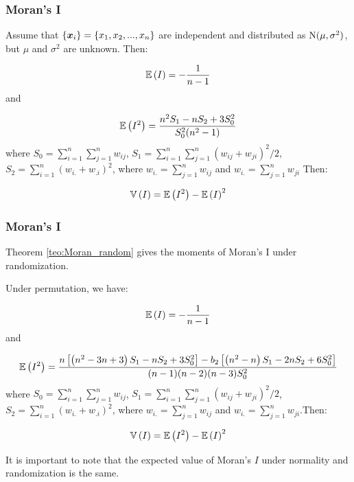 \documentclass[english,10pt]{beamer}\usepackage[]{graphicx}\usepackage[]{xcolor}
\begin{document}
\begin{frame}
  \frametitle{Moran's I}
    \begin{theorem}\label{teo:Moran_normal}
Assume that $\left\lbrace \bm x_i\right\rbrace = \left\lbrace x_1, x_2,..., x_n\right\rbrace$ are independent and distributed as $\mathrm{N}(\mu, \sigma^2)$, but $\mu$ and $\sigma^2$ are unknown. Then:

\begin{equation}
\mathbb{E}\left(I\right) = - \frac{1}{n - 1} 
\end{equation}
%
and

\begin{equation}
\mathbb{E}\left(I^2\right) = \frac{n^2S_1 - nS_2 + 3S_0^2}{S_0^2(n^2 - 1)}
\end{equation}
%
where $S_0=\sum_{i = 1}^n\sum_{j=1}^nw_{ij}$, $S_1= \sum_{i = 1}^n\sum_{j = 1}^n(w_{ij} + w_{ji})^2/2$, $S_2 = \sum_{i = 1}^n(w_{i.} + w_{.i})^2$, where $w_{i.}= \sum_{j = 1}^nw_{ij}$ and $w_{i.}=\sum_{j = 1}^nw_{ji}$
Then:

\begin{equation}
\mathbb{V}\left(I\right)=\mathbb{E}\left(I^2\right) - \mathbb{E}\left(I\right)^2
\end{equation}
\end{theorem}
\end{frame}

\begin{frame}
  \frametitle{Moran's I}
  Theorem \ref{teo:Moran_random} gives the moments of Moran's I under randomization. 


\begin{theorem}\label{teo:Moran_random}
Under permutation, we have:

\begin{equation}
\mathbb{E}\left(I\right) = - \frac{1}{n - 1} 
\end{equation}
%
and

\begin{equation}
\mathbb{E}\left(I^2\right) = \frac{n\left[\left(n^2 - 3n + 3\right)S_1 - nS_2 + 3S_0^2\right]-b_2\left[\left(n^2 - n\right)S_1 - 2nS_2 + 6S_0^2\right]}{(n-1)(n-2)(n-3)S_0^2}
\end{equation}
%
where $S_0=\sum_{i = 1}^n\sum_{j=1}^nw_{ij}$, $S_1= \sum_{i = 1}^n\sum_{j = 1}^n(w_{ij} + w_{ji})^2/2$, $S_2 = \sum_{i = 1}^n(w_{i.} + w_{.i})^2$, where $w_{i.}= \sum_{j = 1}^nw_{ij}$ and $w_{i.}=\sum_{j = 1}^nw_{ji}$.Then:

\begin{equation}
\mathbb{V}\left(I\right)=\mathbb{E}\left(I^2\right) - \mathbb{E}\left(I\right)^2
\end{equation}
\end{theorem}

It is important to note that the expected value of Moran's $I$ under normality and randomization is the same. 
\end{frame}
\end{document}
